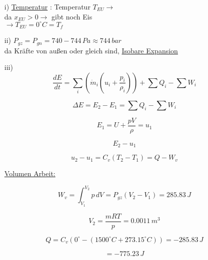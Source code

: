 \begin{itemize}
    \item[i)] \underline{Temperatur} : Temperatur $T_{EU} \rightarrow$ \\
    da $x_{EU} > 0 \rightarrow$ gibt noch Eis \\
    $\rightarrow T_{EU} = 0^\circ C = T_f$
    
    \item[ii)] $P_{gz} = P_{gn} = 740 - 744 \, Pa \approx 744 \, bar$ \\
    da Kräfte von außen oder gleich sind, \underline{Isobare Expansion}
    
    \item[iii)] 
    \begin{equation*}
        \frac{dE}{dt} = \sum_i (\dot{m}_i (u_i + \frac{p_i}{\rho_i})) + \sum Q_i - \sum W_i
    \end{equation*}
    
    \begin{equation*}
        \Delta E = E_2 - E_1 = \sum Q_i - \sum W_i
    \end{equation*}
    
    \begin{equation*}
        E_1 = U + \frac{pV}{\rho} = u_1
    \end{equation*}
    
    \begin{equation*}
        E_2 - u_1
    \end{equation*}
    
    \begin{equation*}
        u_2 - u_1 = C_v (T_2 - T_1) = Q - W_v
    \end{equation*}
    
    \underline{Volumen Arbeit:}
    
    \begin{equation*}
        W_v = \int_{V_1}^{V_2} p \, dV = P_{gz} (V_2 - V_1) = 285.83 \, J
    \end{equation*}
    
    \begin{equation*}
        V_2 = \frac{mRT}{p} = 0.0011 \, m^3
    \end{equation*}
    
    \begin{equation*}
        Q = C_v (0^\circ - (1500^\circ C + 273.15^\circ C)) = -285.83 \, J
    \end{equation*}
    
    \begin{equation*}
        = -775.23 \, J
    \end{equation*}
\end{itemize}

